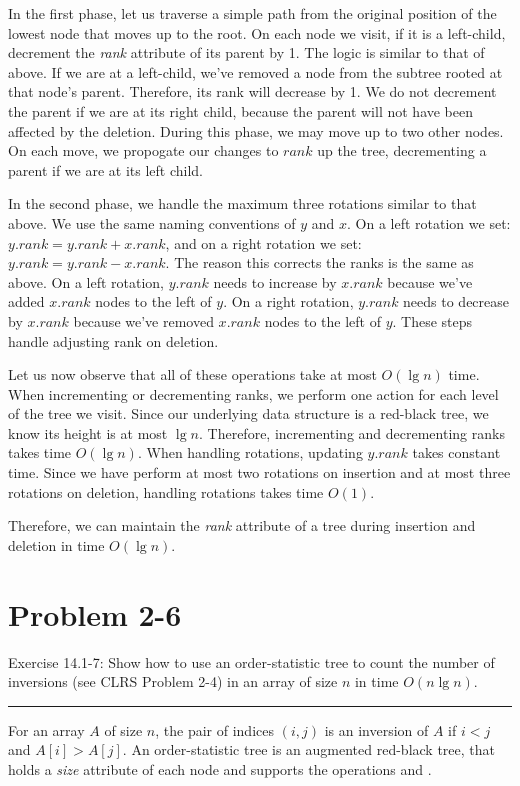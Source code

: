 \documentclass[11pt]{article}
\def\separateline{\medskip\hrule\medskip}
\begin{document}
In the first phase, let us traverse a simple path from the original position of the lowest node that moves up to the root. On each node we visit, if it is a left-child, decrement the \textit{rank} attribute of its parent by 1. The logic is similar to that of above. If we are at a left-child, we've removed a node from the subtree rooted at that node's parent. Therefore, its rank will decrease by 1. We do not decrement the parent if we are at its right child, because the parent will not have been affected by the deletion. During this phase, we may move up to two other nodes. On each move, we propogate our changes to $rank$ up the tree, decrementing a parent if we are at its left child.

In the second phase, we handle the maximum three rotations similar to that above. We use the same naming conventions of $y$ and $x$. On a left rotation we set: $y.rank = y.rank + x.rank$, and on a right rotation we set: $y.rank = y.rank - x.rank$. The reason this corrects the ranks is the same as above. On a left rotation, $y.rank$ needs to increase by $x.rank$ because we've added $x.rank$ nodes to the left of $y$. On a right rotation, $y.rank$ needs to decrease by $x.rank$ because we've removed $x.rank$ nodes to the left of $y$. These steps handle adjusting rank on deletion.

Let us now observe that all of these operations take at most $O(\lg{n})$ time. When incrementing or decrementing ranks, we perform one action for each level of the tree we visit. Since our underlying data structure is a red-black tree, we know its height is at most $\lg{n}$. Therefore, incrementing and decrementing ranks takes time $O(\lg{n})$. When handling rotations, updating $y.rank$ takes constant time. Since we have perform at most two rotations on insertion and at most three rotations on deletion, handling rotations takes time $O(1)$.

Therefore, we can maintain the \textit{rank} attribute of a tree during insertion and deletion in time $O(\lg{n})$.

\newpage

\section{Problem 2-6}
Exercise 14.1-7: Show how to use an order-statistic tree to count the number of inversions (see CLRS Problem 2-4) in an array of size $n$ in time $O(n\lg{n})$.
\separateline

For an array $A$ of size $n$, the pair of indices $(i,j)$ is an inversion of $A$ if $i < j$ and $A[i] > A[j]$. An order-statistic tree is an augmented red-black tree, that holds a \textit{size} attribute of each node and supports the operations  and .
\end{document}
